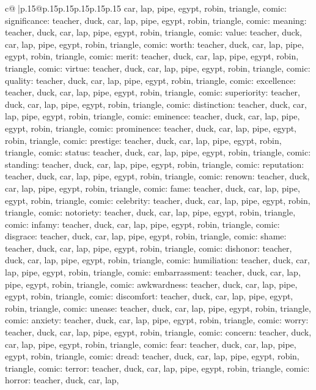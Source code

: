 \documentclass{article}
\begin{document}
{\begin{supertabular}{c@{$\;$}|p{.15\linewidth}@{}p{.15\linewidth}p{.15\linewidth}p{.15\linewidth}p{.15\linewidth}p{.15\linewidth}}
{{{car, lap, pipe, egypt, robin, triangle, comic\n\nCLUE: significance\nTARGETS: teacher, duck, car, lap, pipe, egypt, robin, triangle, comic\n\nCLUE: meaning\nTARGETS: teacher, duck, car, lap, pipe, egypt, robin, triangle, comic\n\nCLUE: value\nTARGETS: teacher, duck, car, lap, pipe, egypt, robin, triangle, comic\n\nCLUE: worth\nTARGETS: teacher, duck, car, lap, pipe, egypt, robin, triangle, comic\n\nCLUE: merit\nTARGETS: teacher, duck, car, lap, pipe, egypt, robin, triangle, comic\n\nCLUE: virtue\nTARGETS: teacher, duck, car, lap, pipe, egypt, robin, triangle, comic\n\nCLUE: quality\nTARGETS: teacher, duck, car, lap, pipe, egypt, robin, triangle, comic\n\nCLUE: excellence\nTARGETS: teacher, duck, car, lap, pipe, egypt, robin, triangle, comic\n\nCLUE: superiority\nTARGETS: teacher, duck, car, lap, pipe, egypt, robin, triangle, comic\n\nCLUE: distinction\nTARGETS: teacher, duck, car, lap, pipe, egypt, robin, triangle, comic\n\nCLUE: eminence\nTARGETS: teacher, duck, car, lap, pipe, egypt, robin, triangle, comic\n\nCLUE: prominence\nTARGETS: teacher, duck, car, lap, pipe, egypt, robin, triangle, comic\n\nCLUE: prestige\nTARGETS: teacher, duck, car, lap, pipe, egypt, robin, triangle, comic\n\nCLUE: status\nTARGETS: teacher, duck, car, lap, pipe, egypt, robin, triangle, comic\n\nCLUE: standing\nTARGETS: teacher, duck, car, lap, pipe, egypt, robin, triangle, comic\n\nCLUE: reputation\nTARGETS: teacher, duck, car, lap, pipe, egypt, robin, triangle, comic\n\nCLUE: renown\nTARGETS: teacher, duck, car, lap, pipe, egypt, robin, triangle, comic\n\nCLUE: fame\nTARGETS: teacher, duck, car, lap, pipe, egypt, robin, triangle, comic\n\nCLUE: celebrity\nTARGETS: teacher, duck, car, lap, pipe, egypt, robin, triangle, comic\n\nCLUE: notoriety\nTARGETS: teacher, duck, car, lap, pipe, egypt, robin, triangle, comic\n\nCLUE: infamy\nTARGETS: teacher, duck, car, lap, pipe, egypt, robin, triangle, comic\n\nCLUE: disgrace\nTARGETS: teacher, duck, car, lap, pipe, egypt, robin, triangle, comic\n\nCLUE: shame\nTARGETS: teacher, duck, car, lap, pipe, egypt, robin, triangle, comic\n\nCLUE: dishonor\nTARGETS: teacher, duck, car, lap, pipe, egypt, robin, triangle, comic\n\nCLUE: humiliation\nTARGETS: teacher, duck, car, lap, pipe, egypt, robin, triangle, comic\n\nCLUE: embarrassment\nTARGETS: teacher, duck, car, lap, pipe, egypt, robin, triangle, comic\n\nCLUE: awkwardness\nTARGETS: teacher, duck, car, lap, pipe, egypt, robin, triangle, comic\n\nCLUE: discomfort\nTARGETS: teacher, duck, car, lap, pipe, egypt, robin, triangle, comic\n\nCLUE: unease\nTARGETS: teacher, duck, car, lap, pipe, egypt, robin, triangle, comic\n\nCLUE: anxiety\nTARGETS: teacher, duck, car, lap, pipe, egypt, robin, triangle, comic\n\nCLUE: worry\nTARGETS: teacher, duck, car, lap, pipe, egypt, robin, triangle, comic\n\nCLUE: concern\nTARGETS: teacher, duck, car, lap, pipe, egypt, robin, triangle, comic\n\nCLUE: fear\nTARGETS: teacher, duck, car, lap, pipe, egypt, robin, triangle, comic\n\nCLUE: dread\nTARGETS: teacher, duck, car, lap, pipe, egypt, robin, triangle, comic\n\nCLUE: terror\nTARGETS: teacher, duck, car, lap, pipe, egypt, robin, triangle, comic\n\nCLUE: horror\nTARGETS: teacher, duck, car, lap, }}}
\end{supertabular}}
\end{document}
